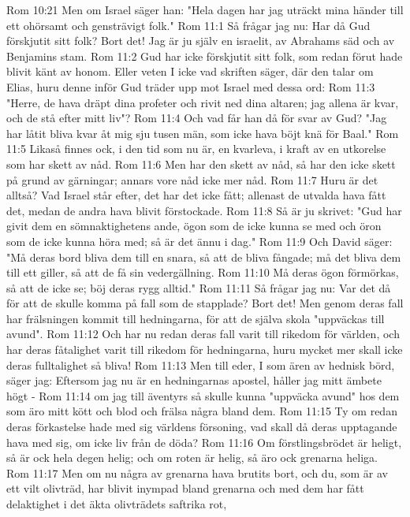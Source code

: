Rom 10:21  Men om Israel säger han: "Hela dagen har jag uträckt mina händer till ett ohörsamt och gensträvigt folk."
Rom 11:1  Så frågar jag nu: Har då Gud förskjutit sitt folk? Bort det! Jag är ju själv en israelit, av Abrahams säd och av Benjamins stam.
Rom 11:2  Gud har icke förskjutit sitt folk, som redan förut hade blivit känt av honom. Eller veten I icke vad skriften säger, där den talar om Elias, huru denne inför Gud träder upp mot Israel med dessa ord:
Rom 11:3  "Herre, de hava dräpt dina profeter och rivit ned dina altaren; jag allena är kvar, och de stå efter mitt liv"?
Rom 11:4  Och vad får han då för svar av Gud? "Jag har låtit bliva kvar åt mig sju tusen män, som icke hava böjt knä för Baal."
Rom 11:5  Likaså finnes ock, i den tid som nu är, en kvarleva, i kraft av en utkorelse som har skett av nåd.
Rom 11:6  Men har den skett av nåd, så har den icke skett på grund av gärningar; annars vore nåd icke mer nåd.
Rom 11:7  Huru är det alltså? Vad Israel står efter, det har det icke fått; allenast de utvalda hava fått det, medan de andra hava blivit förstockade.
Rom 11:8  Så är ju skrivet: "Gud har givit dem en sömnaktighetens ande, ögon som de icke kunna se med och öron som de icke kunna höra med; så är det ännu i dag."
Rom 11:9  Och David säger: "Må deras bord bliva dem till en snara, så att de bliva fångade; må det bliva dem till ett giller, så att de få sin vedergällning.
Rom 11:10  Må deras ögon förmörkas, så att de icke se; böj deras rygg alltid."
Rom 11:11  Så frågar jag nu: Var det då för att de skulle komma på fall som de stapplade? Bort det! Men genom deras fall har frälsningen kommit till hedningarna, för att de själva skola "uppväckas till avund".
Rom 11:12  Och har nu redan deras fall varit till rikedom för världen, och har deras fåtalighet varit till rikedom för hedningarna, huru mycket mer skall icke deras fulltalighet så bliva!
Rom 11:13  Men till eder, I som ären av hednisk börd, säger jag: Eftersom jag nu är en hedningarnas apostel, håller jag mitt ämbete högt -
Rom 11:14  om jag till äventyrs så skulle kunna "uppväcka avund" hos dem som äro mitt kött och blod och frälsa några bland dem.
Rom 11:15  Ty om redan deras förkastelse hade med sig världens försoning, vad skall då deras upptagande hava med sig, om icke liv från de döda?
Rom 11:16  Om förstlingsbrödet är heligt, så är ock hela degen helig; och om roten är helig, så äro ock grenarna heliga.
Rom 11:17  Men om nu några av grenarna hava brutits bort, och du, som är av ett vilt olivträd, har blivit inympad bland grenarna och med dem har fått delaktighet i det äkta olivträdets saftrika rot,
